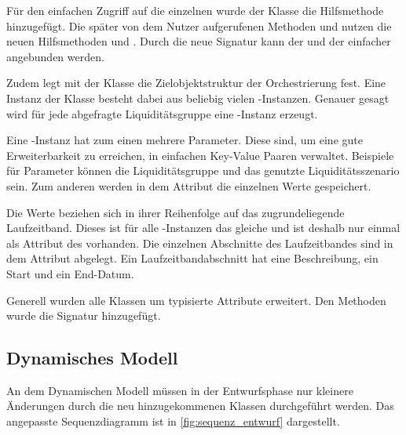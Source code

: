 \begin{onehalfspacing}
Für den einfachen Zugriff auf die einzelnen  wurde der Klasse  die Hilfsmethode  hinzugefügt. Die später von dem Nutzer aufgerufenen Methoden  und  nutzen die neuen Hilfsmethoden  und . Durch die neue Signatur kann der  und der  einfacher angebunden werden.


\label{sec:entwurf:statisch:orchestratorresult}
Zudem legt mit der Klasse  die Zielobjektstruktur der Orchestrierung fest. Eine Instanz der Klasse  besteht dabei aus beliebig vielen -Instanzen. Genauer gesagt wird für jede abgefragte Liquiditätsgruppe eine -Instanz erzeugt.

Eine -Instanz hat zum einen mehrere Parameter. Diese sind, um eine gute Erweiterbarkeit zu erreichen, in einfachen Key-Value Paaren verwaltet. Beispiele für Parameter können die Liquiditätsgruppe und das genutzte Liquiditätsszenario sein. Zum anderen werden in dem Attribut  die einzelnen Werte gespeichert.

Die Werte beziehen sich in ihrer Reihenfolge auf das zugrundeliegende Laufzeitband. Dieses ist für alle -Instanzen das gleiche und ist deshalb nur einmal als Attribut des  vorhanden. Die einzelnen Abschnitte des Laufzeitbandes sind in dem Attribut  abgelegt. Ein Laufzeitbandabschnitt hat eine Beschreibung, ein Start und ein End-Datum.

Generell wurden alle Klassen um typisierte Attribute erweitert. Den Methoden wurde die Signatur hinzugefügt.

\subsection{Dynamisches Modell}

An dem Dynamischen Modell müssen in der Entwurfsphase nur kleinere Änderungen durch die neu hinzugekommenen Klassen durchgeführt werden. Das angepasste Sequenzdiagramm ist in \vref{fig:sequenz_entwurf} dargestellt.


\end{onehalfspacing}
